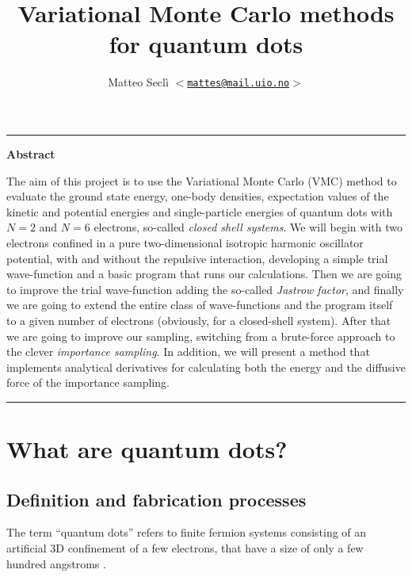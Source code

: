 \documentclass[a4paper,twoside,11pt]{book}
\author{
\normalsize Matteo Seclì \texttt{$<$\href{mailto:mattes@mail.uio.no}
{mattes@mail.uio.no}$>$}\\
}
\title{\textbf{Variational Monte Carlo methods for quantum dots}}
\begin{document}
\frontmatter

\maketitle

\hrule
\begin{center}
	\large\textbf{Abstract}
	\medskip\\
	\begin{minipage}[c][][c]{0.8\textwidth}
		\small{
			The aim of this project is to use the Variational Monte Carlo (VMC) 
			method to evaluate the ground state energy, one-body densities, 
			expectation values of the kinetic and potential energies and 
			single-particle energies of quantum dots with $N = 2$ and $N = 6$ 
			electrons, so-called \emph{closed shell systems}. We will begin with 
			two electrons confined in a pure two-dimensional isotropic harmonic 
			oscillator potential, with and without the repulsive interaction, developing
			a simple trial wave-function and a basic program that runs our calculations.
			Then we are going to improve the trial wave-function adding the so-called 
			\emph{Jastrow factor}, and finally we are going to extend the entire class of
			wave-functions and the program itself to a given number of electrons 
			(obviously, for a closed-shell system). After that we are going to improve
			our sampling, switching from a brute-force approach to the clever
			\emph{importance sampling}. In addition, we will present a method that 
			implements analytical derivatives for calculating both the energy and the
			diffusive force of the importance sampling.			
		}
	\end{minipage}
\end{center}
\medskip
\hrule

\tableofcontents

\mainmatter

\chapter{What are quantum dots?}

\section{Definition and fabrication processes}
The term ``quantum dots'' refers to finite fermion systems consisting of an artificial 3D confinement of a few electrons, that have a size of only a few hundred angstroms \citep{Reimann2002, Kastner1993}.
\end{document}

